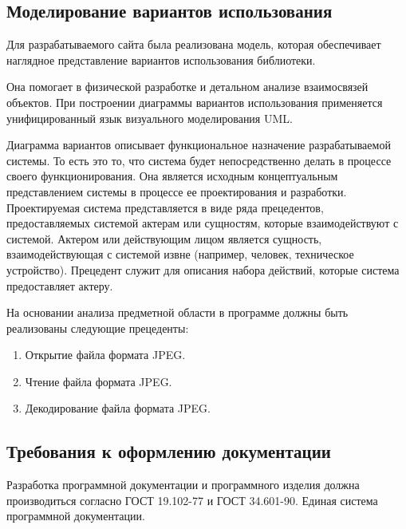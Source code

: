 \subsection{Моделирование вариантов использования}

Для разрабатываемого сайта была реализована модель, которая обеспечивает наглядное представление вариантов использования библиотеки.

Она помогает в физической разработке и детальном анализе взаимосвязей объектов. При построении диаграммы вариантов использования применяется унифицированный язык визуального моделирования UML.

Диаграмма вариантов описывает функциональное назначение разрабатываемой системы. То есть это то, что система будет непосредственно делать в процессе своего функционирования. Она является исходным концептуальным представлением системы в процессе ее проектирования и разработки. Проектируемая система представляется в виде ряда прецедентов, предоставляемых системой актерам или сущностям, которые взаимодействуют с системой. Актером или действующим лицом является сущность, взаимодействующая с системой извне (например, человек, техническое устройство). Прецедент служит для описания набора действий, которые система предоставляет актеру.

На основании анализа предметной области в программе должны быть реализованы следующие прецеденты:
\begin{enumerate}
\item Открытие файла формата JPEG.
\item Чтение файла формата JPEG.
\item Декодирование файла формата JPEG.
\end{enumerate}

\subsection{Требования к оформлению документации}

Разработка программной документации и программного изделия должна производиться согласно ГОСТ 19.102-77 и ГОСТ 34.601-90. Единая система программной документации.

